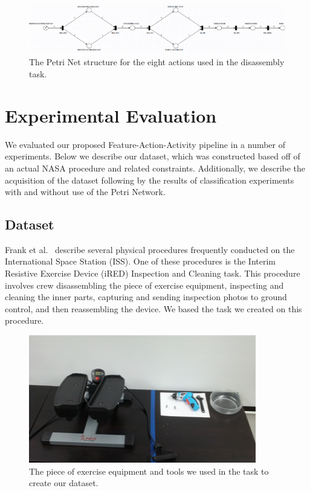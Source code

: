 \documentclass[10pt,twocolumn,letterpaper]{article}
\begin{document}
\begin{figure}[t]
    \centering
    \includegraphics[width=7.1in]{fig/petri.png}
    \caption{The Petri Net structure for the eight actions used in the disassembly task.}
    \label{fig:petri}
\end{figure}

\section{Experimental Evaluation}

We evaluated our proposed Feature-Action-Activity pipeline in a number of experiments. Below we describe our dataset, which was constructed based off of an actual NASA procedure and related constraints. Additionally, we describe the acquisition of the dataset following by the results of classification experiments with and without use of the Petri Network.

\subsection{Dataset}

Frank et al.~\cite{frank2013autonomous} describe several physical procedures frequently conducted on the International Space Station (ISS). One of these procedures is the Interim Resistive Exercise Device (iRED) Inspection and Cleaning task. This procedure involves crew disassembling the piece of exercise equipment, inspecting and cleaning the inner parts, capturing and sending inspection photos to ground control, and then reassembling the device. We based the task we created on this procedure.

\begin{figure}[!t]
    \centering
    \includegraphics[width=\columnwidth]{fig/equipment.png}
    \caption{The piece of exercise equipment and tools we used in the task to create our dataset.}
    \label{fig:equipment}
\end{figure}
\end{document}
